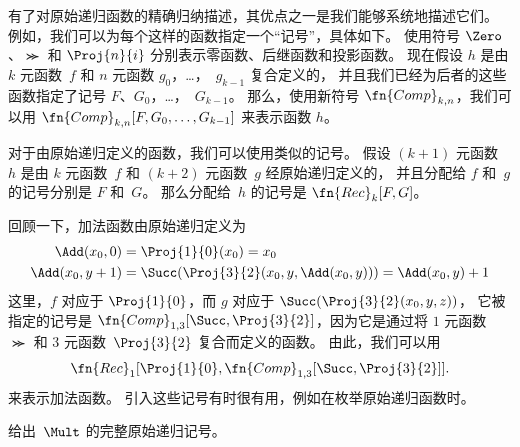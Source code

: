 \documentclass[../../../include/open-logic-section]{subfiles}
\begin{document}

有了对原始递归函数的精确归纳描述，其优点之一是我们能够系统地描述它们。
例如，我们可以为每个这样的函数指定一个“记号”，具体如下。
使用符号 $\Zero$、$\Succ$ 和 $\Proj{n}{i}$ 分别表示零函数、后继函数和投影函数。
现在假设 $h$ 是由 $k$ 元函数~$f$ 和 $n$ 元函数 $g_0$，\dots，~$g_{k-1}$ 复合定义的，
并且我们已经为后者的这些函数指定了记号 $F$、$G_0$，\dots，~$G_{k-1}$。
那么，使用新符号 $\fn{Comp}_{k,n}$，我们可以用
$\fn{Comp}_{k,n}[F,G_0,\dots,G_{k-1}]$
来表示函数 $h$。

对于由原始递归定义的函数，我们可以使用类似的记号。
假设 $(k+1)$ 元函数~$h$ 是由 $k$ 元函数~$f$ 和 $(k+2)$ 元函数~$g$ 经原始递归定义的，
并且分配给 $f$ 和~$g$ 的记号分别是 $F$ 和~$G$。
那么分配给~$h$ 的记号是 $\fn{Rec}_k[F,G]$。

回顾一下，加法函数由原始递归定义为
\begin{align*}
  \Add(x_0, 0) & = \Proj{1}{0}(x_0) = x_0\\
  \Add(x_0, y+1) & = \Succ(\Proj{3}{2}(x_0, y, \Add(x_0, y))) = \Add(x_0, y) +1
\end{align*}
这里，$f$ 对应于 $\Proj{1}{0}$，而 $g$ 对应于 $\Succ(\Proj{3}{2}(x_0, y, z))$，
它被指定的记号是 $\fn{Comp}_{1,3}[\Succ,\Proj{3}{2}]$，因为它是通过将 $1$ 元函数~$\Succ$ 和 $3$ 元函数~$\Proj{3}{2}$ 复合而定义的函数。
由此，我们可以用
\[
\fn{Rec}_1[\Proj{1}{0},\fn{Comp}_{1,3}[\Succ,\Proj{3}{2}]].
\]
来表示加法函数。
引入这些记号有时很有用，例如在枚举原始递归函数时。

\begin{prob}
  给出~$\Mult$ 的完整原始递归记号。
\end{prob}
\end{document}
